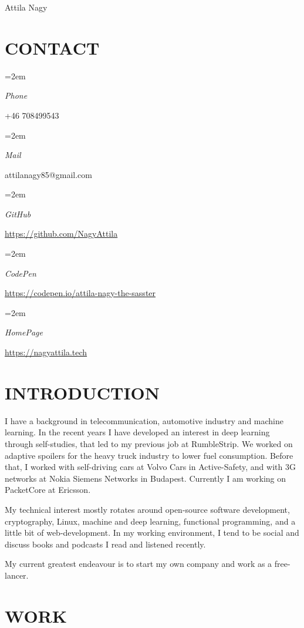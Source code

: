 \documentclass[paper=a4,fontsize=11pt]{scrartcl}	 			%
\newlength{\spacebox}
\newcommand{\MyName}[1]{
		\Huge \usefont{OT1}{phv}{b}{n} \hfill #1 		%
		\par \normalsize \normalfont}
\newcommand{\MySlogan}[1]{
		\large \usefont{OT1}{phv}{m}{n}\hfill \textit{#1} %
		\par \normalsize \normalfont}
\newcommand{\NewPart}[1]{\section*{\uppercase{#1}}}
\newcommand{\PersonalEntry}[2]{
		\noindent\hangindent=2em\hangafter=0 		%
		\parbox{\spacebox}{						%
		\textit{#1}}								%
		\hspace{1.5em} #2 \par}					%
\begin{document}
\MyName{Attila Nagy}

\NewPart{Contact}{}

\PersonalEntry{Phone}{+46 708499543}
\PersonalEntry{Mail}{attilanagy85@gmail.com}
\PersonalEntry{GitHub}{\href{https://github.com/NagyAttila}{https://github.com/NagyAttila}}
\PersonalEntry{CodePen}{\href{https://codepen.io/attila-nagy-the-sasster}{https://codepen.io/attila-nagy-the-sasster}}
\PersonalEntry{HomePage}{\href{https://nagyattila.tech}{https://nagyattila.tech}}

\NewPart{Introduction}{}

I have a background in telecommunication, automotive industry and machine learning. In the recent years I have developed an interest in deep learning through self-studies, that led to my previous job at RumbleStrip. We worked on adaptive spoilers for the heavy truck industry to lower fuel consumption. Before that, I worked with self-driving cars at Volvo Cars in Active-Safety, and with 3G networks at Nokia Siemens Networks in Budapest. Currently I am working on PacketCore at Ericsson.

My technical interest mostly rotates around open-source software development, cryptography, Linux, machine and deep learning, functional programming, and a little bit of web-development. In my working environment, I tend to be social and discuss books and podcasts I read and listened recently.

My current greatest endeavour is to start my own company and work as a free-lancer.


\NewPart{Work}{}
\end{document}
